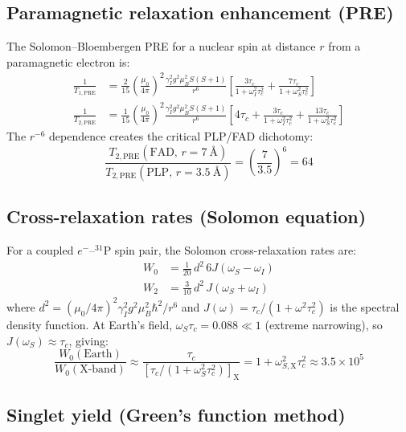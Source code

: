 \documentclass[11pt]{article}
\begin{document}
\subsection{Paramagnetic relaxation enhancement (PRE)}

The Solomon--Bloembergen PRE for a nuclear spin at distance $r$ from a paramagnetic electron is\cite{Solomon1955,Bloembergen1957}:
\begin{align}
\frac{1}{T_{1,\mathrm{PRE}}} &= \frac{2}{15}\left(\frac{\mu_0}{4\pi}\right)^2 \frac{\gamma_I^2 g^2 \mu_B^2 S(S+1)}{r^6} \left[\frac{3\tau_c}{1+\omega_I^2\tau_c^2} + \frac{7\tau_c}{1+\omega_S^2\tau_c^2}\right] \label{eq:PRE_T1}\\[6pt]
\frac{1}{T_{2,\mathrm{PRE}}} &= \frac{1}{15}\left(\frac{\mu_0}{4\pi}\right)^2 \frac{\gamma_I^2 g^2 \mu_B^2 S(S+1)}{r^6} \left[4\tau_c + \frac{3\tau_c}{1+\omega_I^2\tau_c^2} + \frac{13\tau_c}{1+\omega_S^2\tau_c^2}\right] \label{eq:PRE_T2}
\end{align}
The $r^{-6}$ dependence creates the critical PLP/FAD dichotomy:
\begin{equation}
\frac{T_{2,\mathrm{PRE}}(\mathrm{FAD},\,r=7~\text{\AA})}{T_{2,\mathrm{PRE}}(\mathrm{PLP},\,r=3.5~\text{\AA})} = \left(\frac{7}{3.5}\right)^6 = 64
\end{equation}

\subsection{Cross-relaxation rates (Solomon equation)}

For a coupled $e^-$--$^{31}$P spin pair, the Solomon cross-relaxation rates are\cite{Solomon1955}:
\begin{align}
W_0 &= \frac{1}{20}\,d^2\,6J(\omega_S - \omega_I) \label{eq:W0}\\
W_2 &= \frac{3}{10}\,d^2\,J(\omega_S + \omega_I) \label{eq:W2}
\end{align}
where $d^2 = (\mu_0/4\pi)^2 \gamma_I^2 g^2 \mu_B^2 \hbar^2 / r^6$ and $J(\omega) = \tau_c/(1 + \omega^2\tau_c^2)$ is the spectral density function. At Earth's field, $\omega_S\tau_c = 0.088 \ll 1$ (extreme narrowing), so $J(\omega_S) \approx \tau_c$, giving:
\begin{equation}
\frac{W_0(\mathrm{Earth})}{W_0(\mathrm{X\text{-}band})} \approx \frac{\tau_c}{[\tau_c/(1 + \omega_S^2\tau_c^2)]_\mathrm{X}} = 1 + \omega_{S,\mathrm{X}}^2\tau_c^2 \approx 3.5 \times 10^5
\end{equation}

\subsection{Singlet yield (Green's function method)}
\end{document}
